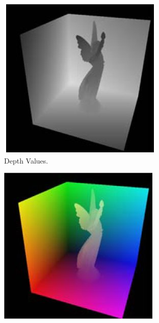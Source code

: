 \begin{figure}
		\centering
        \begin{subfigure}[b]{0.4\textwidth}
                \centering
                \includegraphics[width=\textwidth]{shadowMap1.jpg}
                \caption{Depth Values.}
                \label{fig:RSM0}
        \end{subfigure}
        \begin{subfigure}[b]{0.4\textwidth}
				\centering
                \includegraphics[width=\textwidth]{RSM1.jpg}

\end{subfigure}
\end{figure}
